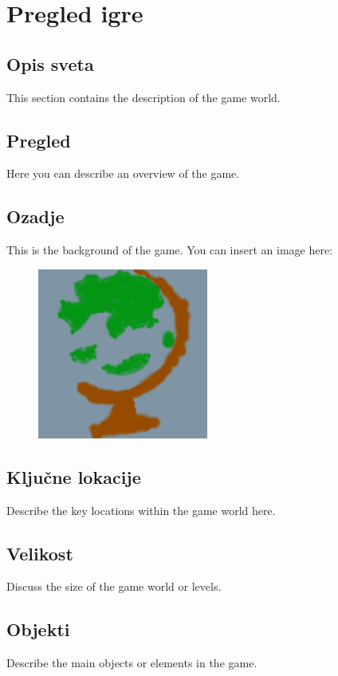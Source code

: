 \documentclass[a4paper,12pt]{article}
\begin{document}
\section{Pregled igre}

\subsection{Opis sveta}
\noindent This section contains the description of the game world.

\subsection{Pregled}
\noindent Here you can describe an overview of the game.

\subsection{Ozadje}
\noindent This is the background of the game. You can insert an image here:

\begin{figure}[h!]
    \centering
    \includegraphics[width=0.5\textwidth]{./slika.png}
\end{figure}

\subsection{Ključne lokacije}
\noindent Describe the key locations within the game world here.

\subsection{Velikost}
\noindent Discuss the size of the game world or levels.

\subsection{Objekti}
\noindent Describe the main objects or elements in the game.
\end{document}
